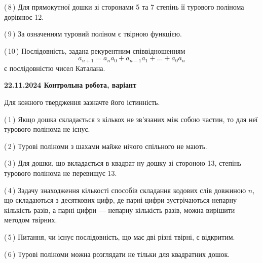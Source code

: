 \documentclass[12pt, ukrainian]{article}
\begin{document}
\begin {large}
\begin {large}
\begin {large}
\begin {large}
\begin {large}
\begin {large}
\begin {large}
\begin {large}
\begin {large}
\begin {large}
\begin {large}
\begin {large}
\begin {large}
\begin {large}
\begin {large}
\begin {large}
\begin {large}
\begin {large}
\begin {large}
\begin {large}
\begin {large}
\begin {large}
\begin {large}
\begin {large}
\begin {large}
\begin {large}
\begin {large}
\begin {large}
\begin {large}
\begin {large}
\begin {large}
\begin {large}
{(\,8\,) Для прямокутної дошки зі сторонами 5 та 7 степінь її турового полінома дорівнює 12.%



(\,9\,) За означенням туровий поліном є твірною функцією.%



(\,10\,) Послідовність, задана рекурентним співвідношенням $$a_{n+1}=a_{n}a_{0}+a_{n-1}a_{1}+\ldots+a_0a_{n}$$ є послідовністю чисел Каталана.%




\vspace{5mm}
}
\newpage

\begin {large}

\textbf{22.11.2024 Контрольна робота, варіант  }\par


{
Для кожного твердження зазначте його істинність.\par

\vspace{2mm}

(\,1\,) Якщо дошка складається з кількох не зв’язаних між собою частин, то для неї турового полінома не існує.%



(\,2\,) Турові поліноми з шахами майже нічого спільного не мають.%



(\,3\,) Для дошки, що вкладається в квадрат ну дошку зі стороною 13, степінь турового полінома не перевищує 13.%



(\,4\,) Задачу знаходження кількості способів складання кодових слів довжиною $n$, що складаються з десяткових цифр, де парні цифри зустрічаються непарну кількість разів, а парні цифри — непарну кількість разів, можна вирішити методом твірних.%



(\,5\,) Питання, чи існує послідовність, що має дві різні твірні, є відкритим.%



(\,6\,) Турові поліноми можна розглядати не тільки для квадратних дошок.%



}
\end{large}
\end{large}
\end{large}
\end{large}
\end{large}
\end{large}
\end{large}
\end{large}
\end{large}
\end{large}
\end{large}
\end{large}
\end{large}
\end{large}
\end{large}
\end{large}
\end{large}
\end{large}
\end{large}
\end{large}
\end{large}
\end{large}
\end{large}
\end{large}
\end{large}
\end{large}
\end{large}
\end{large}
\end{large}
\end{large}
\end{large}
\end{large}
\end{large}
\end{document}
